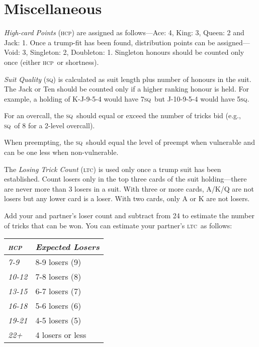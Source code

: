 \documentclass[10pt]{article}%
\newcommand{\gap}{\vspace{\baselineskip}}
\newcommand{\hcp}{\textsc{hcp}}
\newcommand{\sq}{\textsc{sq}}
\newcommand{\ltc}{\textsc{ltc}}
\begin{document}
\section{Miscellaneous}

\emph{High-card Points} (\hcp) are assigned as follows---Ace: 4, King:
3, Queen: 2 and Jack: 1.  Once a trump-fit has been found,
distribution points can be assigned---Void: 3, Singleton: 2,
Doubleton: 1. Singleton honours should be counted only once (either
\hcp\ or shortness).

\gap

\emph{Suit Quality} (\sq) is calculated as suit length plus number of
honours in the suit. The Jack or Ten should be counted only if a
higher ranking honour is held. For example, a holding of K-J-9-5-4
would have 7\sq\ but J-10-9-5-4 would have 5\sq.

For an overcall, the \sq\ should equal or exceed the number of tricks
bid (e.g., \sq\ of 8 for a 2-level overcall).

When preempting, the \sq\ should equal the level of preempt when
vulnerable and can be one less when non-vulnerable.

\gap

The \emph{Losing Trick Count} (\ltc) is used only once a trump suit
has been established. Count losers only in the top three cards of the
suit holding---there are never more than 3 losers in a suit. With
three or more cards, A/K/Q are not losers but any lower card is a
loser. With two cards, only A or K are not losers.

Add your and partner's loser count and subtract from 24 to estimate
the number of tricks that can be won.  You can estimate your partner's
\ltc\ as follows:

\begin{tabular}{p{2.5cm}p{8.5cm}}
  \emph{\hcp{}} & \emph{Expected Losers} \\
  \hline
  \emph{7-9} & 8-9 losers (9) \\
  \emph{10-12} & 7-8 losers (8) \\
  \emph{13-15} & 6-7 losers (7) \\
  \emph{16-18} & 5-6 losers (6) \\
  \emph{19-21} & 4-5 losers (5) \\
  \emph{22+} & 4 losers or less \\
  \hline
\end{tabular}
\end{document}

